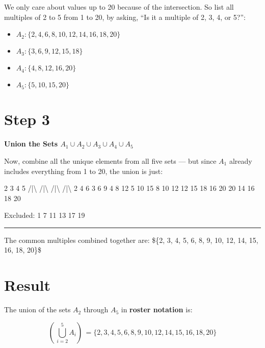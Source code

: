 \documentclass[
  letterpaper,
  DIV=11,
  numbers=noendperiod]{scrreprt}
\newenvironment{Shaded}{\begin{snugshade}}{\end{snugshade}}
\newcommand{\NormalTok}[1]{\textcolor[rgb]{0.00,0.23,0.31}{#1}}
\begin{document}
We only care about values up to 20 because of the intersection. So list
all multiples of 2 to 5 from 1 to 20, by asking, ``Is it a multiple of
2, 3, 4, or 5?'':

\begin{itemize}
\item
  \(A_2:\{ 2, 4, 6, 8, 10, 12, 14, 16, 18, 20 \}\)
\item
  \(A_3:\{ 3, 6, 9, 12, 15, 18 \}\)
\item
  \(A_4:\{ 4, 8, 12, 16, 20 \}\)
\item
  \(A_5:\{ 5, 10, 15, 20 \}\)
\end{itemize}

\section{Step 3}

\textbf{Union the Sets \(A_1 \cup A_2 \cup A_3 \cup A_4 \cup A_5\)}

Now, combine all the unique elements from all five sets --- but since
\(A_1\) already includes everything from 1 to 20, the union is just:

\begin{Shaded}
\begin{Highlighting}[]
\NormalTok{  2           3           4           5}
\NormalTok{ /|\textbackslash{}         /|\textbackslash{}         /|\textbackslash{}         /|\textbackslash{}}
\NormalTok{2 4 6      3 6 9      4 8 12      5 10 15}
\NormalTok{8 10 12    12 15 18   16 20       20}
\NormalTok{14 16 18                 }
\NormalTok{20}

\NormalTok{Excluded:}
\NormalTok{  1  7  11  13  17  19}
\end{Highlighting}
\end{Shaded}

\begin{center}\rule{0.5\linewidth}{0.5pt}\end{center}

The common multiples combined together are: \$\{2, 3, 4, 5, 6, 8, 9, 10,
12, 14, 15, 16, 18, 20\}\$

\section{Result}

The union of the sets \(A_2\) through \(A_5\) in {\textbf{roster
notation}} is:

\[
( \,\bigcup^5_{i=2} A_i) \, = \{ 2, 3, 4, 5, 6, 8, 9, 10, 12, 14, 15, 16, 18, 20 \}
\]
\end{document}
